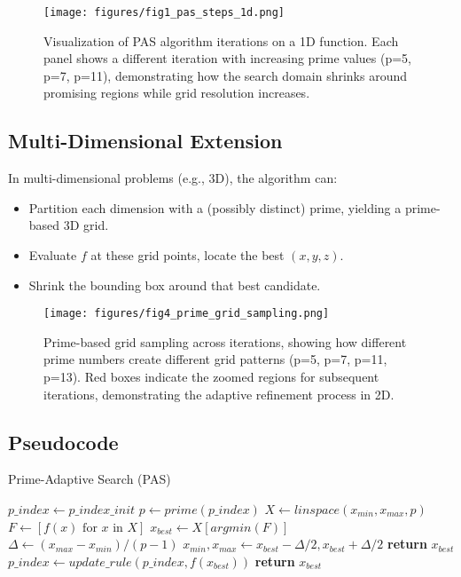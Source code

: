 \documentclass[10pt,twocolumn,letterpaper]{article}
\begin{document}
\begin{figure}[t]
    \centering
    \texttt{[image: figures/fig1\_pas\_steps\_1d.png]}
    \caption{Visualization of PAS algorithm iterations on a 1D function. Each panel shows a different iteration with increasing prime values (p=5, p=7, p=11), demonstrating how the search domain shrinks around promising regions while grid resolution increases.}
    \label{fig:pas_steps_1d}
\end{figure}

\subsection{Multi-Dimensional Extension}

In multi-dimensional problems (e.g., 3D), the algorithm can:
\begin{itemize}
    \item Partition each dimension with a (possibly distinct) prime, yielding a prime-based 3D grid.
    \item Evaluate $f$ at these grid points, locate the best $(x,y,z)$.
    \item Shrink the bounding box around that best candidate.
\end{itemize}

\begin{figure}[t]
    \centering
    \texttt{[image: figures/fig4\_prime\_grid\_sampling.png]}
    \caption{Prime-based grid sampling across iterations, showing how different prime numbers create different grid patterns (p=5, p=7, p=11, p=13). Red boxes indicate the zoomed regions for subsequent iterations, demonstrating the adaptive refinement process in 2D.}
    \label{fig:prime_grid_sampling}
\end{figure}

\subsection{Pseudocode}

\begin{algorithm}
\caption{Prime-Adaptive Search (PAS)}
\begin{algorithmic}[1]
    \State $p\_index \gets p\_index\_init$
        \State $p \gets prime(p\_index)$
        \State $X \gets linspace(x_{min}, x_{max}, p)$
        \State $F \gets [f(x) \text{ for } x \text{ in } X]$
        \State $x_{best} \gets X[argmin(F)]$
        \State $\Delta \gets (x_{max} - x_{min}) / (p - 1)$
        \State $x_{min}, x_{max} \gets x_{best} - \Delta/2, x_{best} + \Delta/2$
            \State \textbf{return} $x_{best}$
        \EndIf
        \State $p\_index \gets update\_rule(p\_index, f(x_{best}))$
    \EndFor
    \State \textbf{return} $x_{best}$
\EndProcedure
\end{algorithmic}
\end{algorithm}
\end{document}
